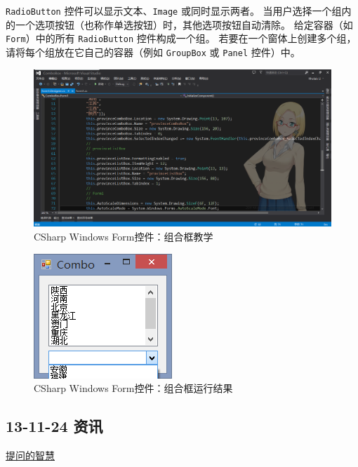 \documentclass[]{report}
\begin{document}
\begin{enumerate}
\begin{itemize}
			\verb|RadioButton| 控件可以显示文本、\verb|Image| 或同时显示两者。
			当用户选择一个组内的一个选项按钮（也称作单选按钮）时，其他选项按钮自动清除。 给定容器（如 \verb|Form|）中的所有 \verb|RadioButton| 控件构成一个组。 若要在一个窗体上创建多个组，请将每个组放在它自己的容器（例如 \verb|GroupBox| 或 \verb|Panel| 控件）中。
	\end{itemize}
\begin{figure}
\centering
\includegraphics[width=1\linewidth]{./PIC/ComboBox}
\caption{CSharp Windows Form控件：组合框教学}
\label{fig:ComboBox}
\end{figure}
\begin{figure}
\centering
\includegraphics[width=0.7\linewidth]{./PIC/ComboBoxO}
\caption{CSharp Windows Form控件：组合框运行结果}
\label{fig:ComboBoxO}
\end{figure}
\end{enumerate}
	\subsection{13-11-24 资讯}
		\href{http://rrurl.cn/fCQ7bT}{提问的智慧}
\end{document}
